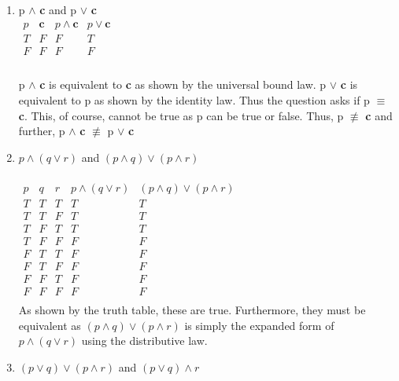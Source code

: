 \documentclass{article}
\makeatletter
\newcommand\setItemnumber[1]{\setcounter{enum\romannumeral\@enumdepth}{\numexpr#1-1\relax}}
\makeatother
\begin{document}
\begin{enumerate}
  \item p $\land$ \textbf{c} and p $\lor$ \textbf{c}
  \\
  \begin{math} 
  \begin{array}{|cc|c|c|}
    p&\textbf{c}& p \land \textbf{c} & p \lor \textbf{c} \\
    \hline
    T&F &F &T\\
    F&F &F &F\\
  \end{array}
  \end{math}
  \\
  \\
  p $\land$ \textbf{c} is equivalent to \textbf{c} as shown by the universal bound law. p $\lor$ \textbf{c} is equivalent to p as shown by the identity law. Thus the question asks if p $\equiv$ \textbf{c}. This, of course, cannot be true as p can be true or false. Thus, p $\not\equiv$ \textbf{c} and further, p $\land$ \textbf{c} $\not\equiv$ p $\lor$ \textbf{c}
  \setItemnumber{22}
  \item$ p \land (q \lor r ) $ and $(p \land q) \lor (p \land r)$
  \\
  \\
  \begin{math} 
  \begin{array}{|ccc|c|c|}
    p&q&r& p \land (q \lor r ) & (p \land q) \lor (p \land r) \\
    \hline
    T&T&T &T &T \\
    T&T&F &T &T\\
    T&F&T &T &T\\
    T&F&F &F &F\\
    F&T&T &F &F\\
    F&T&F &F &F\\
    F&F&T &F &F\\
    F&F&F &F &F\\
  \end{array}
  \end{math}
  \\
  As shown by the truth table, these are true. Furthermore, they must be equivalent as $(p \land q) \lor (p \land r)$ is simply the expanded form of $p \land (q \lor r )$ using the distributive law.
  \setItemnumber{24}
  \item$ (p \lor q ) \lor (p \land r)$ and $(p \lor q ) \land r$
  \\
  \\
  \begin{math} 

\end{math}
\end{enumerate}
\end{document}
